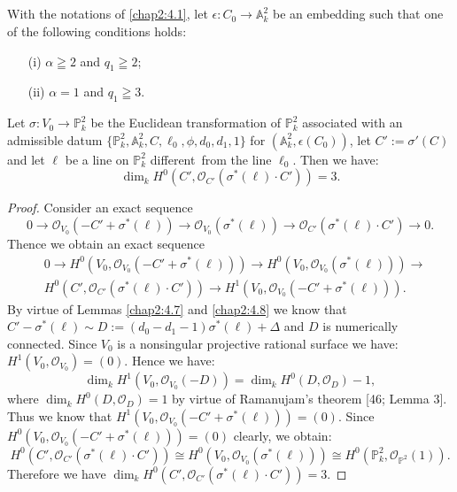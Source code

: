 \subsection{}\label{chap2:4.10}
\begin{lemma*}
  With the notations of \ref{chap2:4.1}, let $\epsilon:C_{0}\to
  \mathbb{A}^{2}_{k}$ be an embedding such that one of the following
  conditions holds:
  \begin{itemize}
  \item[\rm(i)] $\alpha\geqq 2$ and $q_{1}\geqq 2$;
    
  \item[\rm(ii)] $\alpha=1$ and $q_{1}\geqq 3$.
  \end{itemize}
  Let $\sigma:V_{0}\to \mathbb{P}^{2}_{k}$ be the Euclidean
  transformation of $\mathbb{P}^{2}_{k}$ associated with an admissible
  datum
  $\{\mathbb{P}^{2}_{k},\mathbb{A}^{2}_{k},C,\ell_{0},\phi,d_{0},d_{1},1\}$
  for $(\mathbb{A}^{2}_{k},\epsilon(C_{0}))$, let $C':=\sigma'(C)$ and
  let $\ell$ be a line on $\mathbb{P}^{2}_{k}$ different\pageoriginale\
  from the line $\ell_{0}$. Then we have:
  $$
  \dim_{k}H^{0}(C',\mathscr{O}_{C'}(\sigma^{\ast}(\ell)\cdot C'))=3.
  $$
\end{lemma*}

\begin{proof}
Consider an exact sequence
$$
0\to \mathscr{O}_{V_{0}}(-C'+\sigma^{\ast}(\ell))\to
\mathscr{O}_{V_{0}}(\sigma^{\ast}(\ell))\to
\mathscr{O}_{C'}(\sigma^{\ast}(\ell)\cdot C')\to 0.
$$
Thence we obtain an exact sequence
\begin{align*}
& 0\to H^{0}(V_{0},\mathscr{O}_{V_{0}}(-C'+\sigma^{\ast}(\ell)))\to
  H^{0}(V_{0},\mathscr{O}_{V_{0}}(\sigma^{\ast}(\ell)))\to\\
& H^{0}(C',\mathscr{O}_{C'}(\sigma^{\ast}(\ell)\cdot C'))\to
  H^{1}(V_{0},\mathscr{O}_{V_{0}}(-C'+\sigma^{\ast}(\ell))). 
\end{align*}
By virtue of Lemmas \ref{chap2:4.7} and \ref{chap2:4.8} we know that
$C'-\sigma^{\ast}(\ell)\sim
D:=(d_{0}-d_{1}-1)\sigma^{\ast}(\ell)+\Delta$ and $D$ is numerically
connected. Since $V_{0}$ is a nonsingular projective rational surface
we have: $H^{1}(V_{0},\mathscr{O}_{V_{0}})=(0)$. Hence we have:
$$
\dim_{k}H^{1}(V_{0},\mathscr{O}_{V_{0}}(-D))=\dim_{k}H^{0}(D,\mathscr{O}_{D})-1,
$$
where $\dim_{k}H^{0}(D,\mathscr{O}_{D})=1$ by virtue of Ramanujam's
theorem [46; Lemma 3]. Thus we know that
$H^{1}(V_{0},\mathscr{O}_{V_{0}}(-C'+\sigma^{\ast}(\ell)))=(0)$. Since
$H^{0}(V_{0},\mathscr{O}_{V_{0}}(-C'+\sigma^{\ast}(\ell)))=(0)$
clearly, we obtain:
$$
H^{0}(C',\mathscr{O}_{C'}(\sigma^{\ast}(\ell)\cdot C'))\cong
H^{0}(V_{0},\mathscr{O}_{V_{0}}(\sigma^{\ast}(\ell)))\cong
H^{0}(\mathbb{P}^{2}_{k},\mathscr{O}_{\mathbb{P}^{2}}(1)). 
$$
Therefore we have
$\dim_{k}H^{0}(C',\mathscr{O}_{C'}(\sigma^{\ast}(\ell)\cdot
C'))=3$.
\end{proof}

